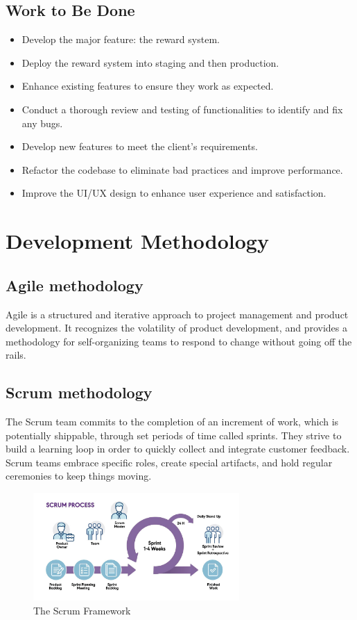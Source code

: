 \subsection{Work to Be Done}
\begin{itemize}
    \item Develop the major feature: the reward system.
    \item  Deploy the reward system into staging and then production.
    \item Enhance existing features to ensure they work as expected.
    \item Conduct a thorough review and testing of functionalities to identify and fix any bugs.
    \item Develop new features to meet the client's requirements.
    \item Refactor the codebase to eliminate bad practices and improve performance.
    \item Improve the UI/UX design to enhance user experience and satisfaction.
\end{itemize}

\section{Development Methodology}
\subsection{Agile methodology}
Agile is a structured and iterative approach to project management and product development.
It recognizes the volatility of product development, and provides a methodology for self-organizing teams to respond to change without going off the rails.

\subsection{Scrum methodology}
The Scrum team commits to the completion of an increment of work, which is potentially shippable, through set periods of time called sprints.
They strive to build a learning loop in order to quickly collect and integrate customer feedback.
Scrum teams embrace specific roles, create special artifacts, and hold regular ceremonies to keep things moving.


\begin{figure}[H]
    \centering
    \includegraphics[width=0.7\textwidth]{src/assets/chapters/blog-scrum-process-opt.jpg}
    \caption{The Scrum Framework}
    \label{fig:Scrum_Framework_image}
\end{figure}


